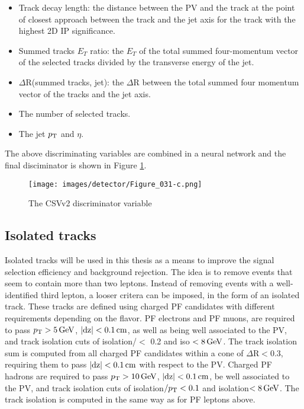 \begin{itemize}
\item Track decay length: the distance between the PV and the track at the point of closest approach between the track and the jet axis for the track with the highest 2D IP significance.
\item Summed tracks $E_T$ ratio: the $E_T$ of the total summed four-momentum vector of the selected tracks divided by the transverse energy of the jet.
\item $\Delta$R(summed tracks, jet): the $\Delta$R between the total summed four momentum vector of the tracks and the jet axis.
\item The number of selected tracks.
\item The jet $p_{\mathrm{T}}$ and $\eta$.
\end{itemize}
The above discriminating variables are combined in a neural network and the final disciminator is shown in Figure \ref{fig:CSVv2}.
\begin{figure}[!h]
\centering
\texttt{[image: images/detector/Figure\_031-c.png]}\\
\caption{The CSVv2 discriminator variable \cite{Sirunyan:2017ezt}}
\label{fig:CSVv2}
\end{figure}
\subsection*{Isolated tracks}\label{sec:isotracks}
\noindent
\justify
Isolated tracks will be used in this thesis as a means to improve the signal selection efficiency and background rejection. 
The idea is to remove events that seem to contain more than two leptons. 
Instead of removing events with a well-identified third lepton, a looser critera can be imposed, in the form of an isolated track.
These tracks are defined using charged PF candidates with different requirements depending on the flavor. 
PF electrons and PF muons, are required to pass $p_{\mathrm{T}}>5\,\text{Ge\hspace{-.08em}V}$, $|\mathrm{dz}|<0.1\,\text{cm}$, as well as being well associated to the PV, and track isolation cuts of isolation/\pt $<$ 0.2 and iso $<8\,\text{Ge\hspace{-.08em}V}$. 
The track isolation sum is computed from all charged PF candidates within a cone of $\Delta$R$<0.3$, requiring them to pass $|\mathrm{dz}|<0.1\,\text{cm}$ with respect to the PV. 
Charged PF hadrons are required to pass $p_{\mathrm{T}}>10\,\text{Ge\hspace{-.08em}V}$, $|\mathrm{dz}|<0.1\,\text{cm}$, be well associated to the PV, and track isolation cuts of isolation$/p_{\mathrm{T}}<0.1$ and isolation$<8\,\text{Ge\hspace{-.08em}V}$. 
The track isolation is computed in the same way as for PF leptons above.

